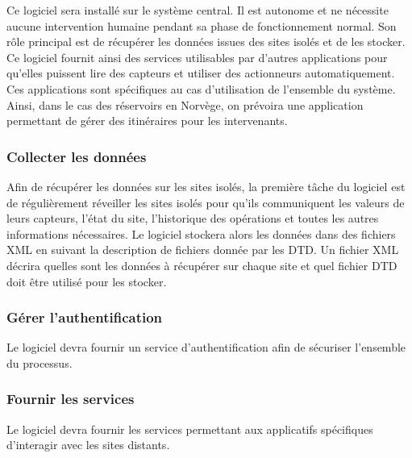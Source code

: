 \documentclass[a4paper, 11pt, final]{article}
\begin{document}
Ce logiciel sera installé sur le système central. Il est autonome et ne nécessite aucune
intervention humaine pendant sa phase de fonctionnement normal.
Son rôle principal est de récupérer les données issues des sites isolés et de les stocker.
Ce logiciel fournit ainsi des services utilisables par d'autres applications pour qu'elles
puissent lire des capteurs et utiliser des actionneurs automatiquement.
Ces applications sont spécifiques au cas d'utilisation de l'ensemble du système.
Ainsi, dans le cas des réservoirs en Norvège, on prévoira une application permettant
de gérer des itinéraires pour les intervenants.

\subsubsection{Collecter les données}
Afin de récupérer les données sur les sites isolés, la première tâche du logiciel est de régulièrement
réveiller les sites isolés pour qu'ils communiquent les valeurs de leurs capteurs, l'état du site,
l'historique des opérations et toutes les autres informations nécessaires.
Le logiciel stockera alors les données dans des fichiers XML en suivant la description de
fichiers donnée par les DTD. Un fichier XML décrira quelles sont les données à récupérer sur chaque
site et quel fichier DTD doit être utilisé pour les stocker.

\subsubsection{Gérer l'authentification}
Le logiciel devra fournir un service d'authentification afin de sécuriser l'ensemble du processus.


\subsubsection{Fournir les services}
Le logiciel devra fournir les services permettant aux applicatifs spécifiques d'interagir
avec les sites distants.

\end{document}
